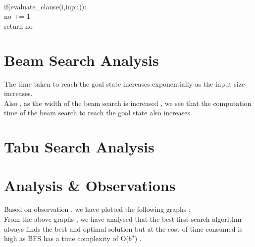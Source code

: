 \documentclass{article}
\begin{document}
            \vspace{2pt}
            \\ \hspace*{30pt}if(evaluate\_clause(i,inpu)):
            \vspace{2pt}
            \\ \hspace*{50pt} no += 1
            \vspace{2pt}
            \\ \hspace*{20pt} return no
\newpage
\section{Beam Search Analysis}
The time taken to reach the goal state increases exponentially as the input size increases.
\\Also , as the width of the beam search is increased , we see that the computation time 
of the beam search to reach the goal state also increases.
\section{Tabu Search Analysis}
\newpage
\section{Analysis \& Observations}
\vspace{5pt}
Based on observation , we have plotted the following graphs :
\vspace{5pt}
\\From the above graphs , we have analysed that the best first search algorithm always finds the best and optimal solution
but at the cost of time consumed is high as BFS has a time complexity of O($b^d$) .
\newpage
\end{document}
